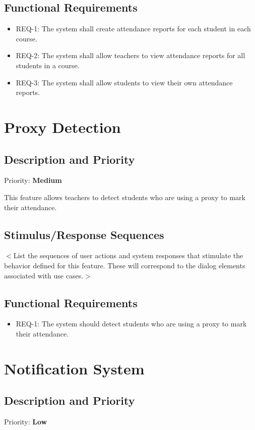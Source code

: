 \documentclass{scrreprt}
\begin{document}
\subsection{Functional Requirements}
\begin{itemize}
    \item REQ-1: The system shall create attendance reports for each student in each course.
    \item REQ-2: The system shall allow teachers to view attendance reports for all students in a course.
    \item REQ-3: The system shall allow students to view their own attendance reports.
\end{itemize}


\section{Proxy Detection}
\subsection{Description and Priority}
Priority: \textbf{Medium}

This feature allows teachers to detect students who are using a proxy to mark their attendance.
\subsection{Stimulus/Response Sequences}
$<$List the sequences of user actions and system responses that stimulate the 
behavior defined for this feature. These will correspond to the dialog elements 
associated with use cases.$>$

\subsection{Functional Requirements}
\begin{itemize}
    \item REQ-1: The system should detect students who are using a proxy to mark their attendance.
\end{itemize}

\section{Notification System}
\subsection{Description and Priority}
Priority: \textbf{Low}
\end{document}
